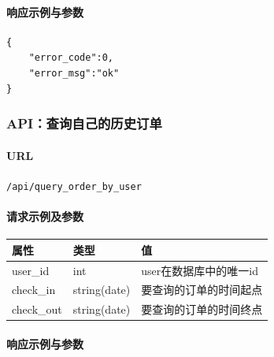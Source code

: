 \documentclass[]{article}
\let\oldparagraph\paragraph
\renewcommand{\paragraph}[1]{\oldparagraph{#1}\mbox{}}
\begin{document}
\hypertarget{ux54cdux5e94ux793aux4f8bux4e0eux53c2ux6570}{%
\paragraph{响应示例与参数}\label{ux54cdux5e94ux793aux4f8bux4e0eux53c2ux6570}}

\begin{verbatim}
{
    "error_code":0,
    "error_msg":"ok"
}
\end{verbatim}

\hypertarget{apiux67e5ux8be2ux81eaux5df1ux7684ux5386ux53f2ux8ba2ux5355}{%
\subsubsection{API：查询自己的历史订单}\label{apiux67e5ux8be2ux81eaux5df1ux7684ux5386ux53f2ux8ba2ux5355}}

\hypertarget{url-4}{%
\paragraph{URL}\label{url-4}}

\texttt{/api/query\_order\_by\_user}

\hypertarget{ux8bf7ux6c42ux793aux4f8bux53caux53c2ux6570-3}{%
\paragraph{请求示例及参数}\label{ux8bf7ux6c42ux793aux4f8bux53caux53c2ux6570-3}}

\begin{Shaded}
\begin{Highlighting}[]
\FunctionTok{\{}
    \FunctionTok{:} \FunctionTok{,}
    \FunctionTok{:} \FunctionTok{,}
    \FunctionTok{:} 
\FunctionTok{\}}
\end{Highlighting}
\end{Shaded}

\begin{longtable}[]{@{}lll@{}}
\toprule
属性 & 类型 & 值\tabularnewline
\midrule
\endhead
user\_id & int & user在数据库中的唯一id\tabularnewline
check\_in & string(date) & 要查询的订单的时间起点\tabularnewline
check\_out & string(date) & 要查询的订单的时间终点\tabularnewline
\bottomrule
\end{longtable}

\hypertarget{ux54cdux5e94ux793aux4f8bux4e0eux53c2ux6570-1}{%
\paragraph{响应示例与参数}\label{ux54cdux5e94ux793aux4f8bux4e0eux53c2ux6570-1}}
\end{document}
